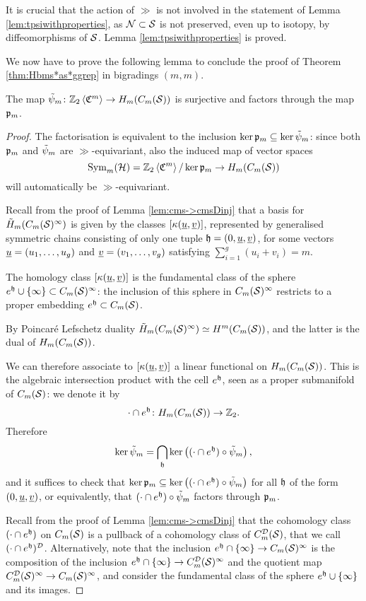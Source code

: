 It is crucial that the action of $\gg$ is not involved in the statement of Lemma
\ref{lem:tpsiwithproperties}, as $\N\subset\S$ is not preserved, even up to isotopy,
by diffeomorphisms of $\S$.
Lemma \ref{lem:tpsiwithproperties} is proved.

We now have to prove the following lemma to conclude the proof of Theorem \ref{thm:Hbms*as*ggrep}
in bigradings $(m,m)$.
\begin{lem}
 \label{lem:tpsi->psi}
The map $\tpsi_m\colon\ZcC{m}\to H_m(\cms)$ is surjective and factors through the map $\pr_m$.
\end{lem}
\begin{proof}
The factorisation is equivalent to the inclusion $\ker\pr_m\subseteq\ker\tpsi_m$: since both
$\pr_m$ and $\tpsi_m$
are $\gg$-equivariant, also the induced map of vector spaces
\[
\Sym_m(\H)=\ZcC{m}/\ker\pr_m\to H_m(\cms)
\]
will automatically be
$\gg$-equivariant.

Recall from the proof of Lemma \ref{lem:cms->cmsDinj} that a basis for $\tH_m(\cms^{\infty})$ 
is given by the classes $[\kappa(\uu,\uv)]$, represented by generalised
symmetric chains consisting of only one tuple $\tup=(0,\uu,\uv)$, for some vectors
$\uu=(u_1,\dots,u_g)$ and $\uv=(v_1,\dots,v_g)$ satisfying $\sum_{i=1}^g(u_i+v_i)=m$.

The homology class
$[\kappa(\uu,\uv)]$ is the fundamental class
of the sphere $e^{\tup}\cup\set{\infty}\subset\cms^{\infty}$: the inclusion of this sphere in $\cms^{\infty}$
restricts to a proper embedding $e^{\tup}\subset\cms$.

By Poincaré Lefschetz duality $\tH_m(\cms^{\infty})\simeq H^m(\cms)$, and the latter is
the dual of $H_m(\cms)$.

We can therefore associate to $[\kappa(\uu,\uv)]$ a linear functional
on $H_m(\cms)$. This is the algebraic intersection product with the cell $e^{\tup}$, seen as a proper submanifold of $\cms$:
we denote it by
\[
 \cdot\cap e^{\tup}\colon H_m(\cms)\to\Z_2.
\]
Therefore
\[
 \ker\tpsi_m=\bigcap_{\tup}\ker\pa{(\cdot\cap e^{\tup})\circ\tpsi_m},
\]
and it suffices to check that $\ker\pr_m\subseteq\ker\pa{(\cdot\cap e^{\tup})\circ\tpsi_m}$
for all $\tup$ of the form $(0,\uu,\uv)$, or equivalently, that $(\cdot\cap e^{\tup})\circ\tpsi_m$ factors through $\pr_m$.

Recall from the proof of Lemma \ref{lem:cms->cmsDinj} that the cohomology class $(\cdot\cap e^{\tup})$ on $\cms$ is a pullback
of a cohomology class of $\cmsD$, that we call $(\cdot\cap e^{\tup})^{\D}$. Alternatively,
note that the inclusion $e^{\tup}\cap \set{\infty}\to\cms^{\infty}$ is the composition of the inclusion $e^{\tup}\cap\set{\infty}\to\cmsD^{\infty}$
and the quotient map $\cmsD^{\infty}\to\cms^{\infty}$, and consider the fundamental class of the sphere $e^{\tup}\cup\set{\infty}$ and its images.


\end{proof}
